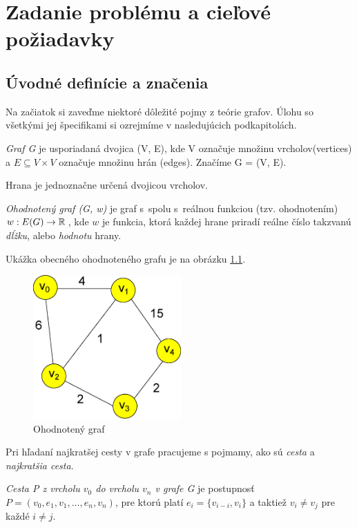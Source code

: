\chapter{Zadanie problému a cieľové požiadavky}

\section{Úvodné definície a značenia}
Na začiatok si zaveďme niektoré dôležité pojmy z teórie grafov.
Úlohu so všetkými jej špecifikami si ozrejmíme v nasledujúcich podkapitolách.
\begin{define}
{\sl Graf G} je usporiadaná dvojica (V, E), kde V označuje množinu vrcholov(vertices) a $E \subseteq V \times V $ označuje množinu hrán (edges). Značíme G = (V, E).
\end{define}


\begin{note}
Hrana je jednoznačne určená dvojicou vrcholov.
\end{note}


\begin{define}
{\sl Ohodnotený graf (G, w)} je graf s~spolu s~reálnou funkciou (tzv. ohodnotením)
$w: E(G) \to \mathbb{R}\,$, kde $w$ je funkcia, ktorá každej hrane priradí
reálne číslo takzvanú \emph{dĺžku}, alebo \emph{hodnotu} hrany.
\end{define}

Ukážka obecného ohodnoteného grafu je na obrázku \ref{fig:ohodnoteny_graf}.

\begin{figure}[h]
\centering
\includegraphics[height=5.5cm]{./img/graf.eps}
\caption{Ohodnotený graf}
\label{fig:ohodnoteny_graf}
\end{figure}

Pri hľadaní najkratšej cesty v grafe pracujeme s pojmamy, ako 
sú \emph{cesta} a \emph{najkratšia cesta}.

\begin{define}
{\sl Cesta P z vrcholu $v_0$ do vrcholu $v_n$ v grafe G } je postupnosť $P = (v_{0},e_{1},v_{1},\dots, e_{n}, v_{n})$,
pre ktorú platí $e_{i} = \{v_{i-i},v_{i}\}$ a taktiež
$v_{i} \ne v_{j}$ pre každé $i \ne j$.
\end{define}

